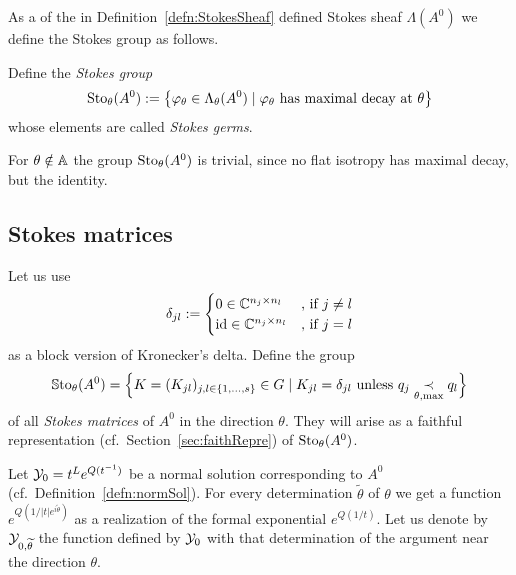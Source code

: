As a  of the in
Definition~\ref{defn:StokesSheaf} defined Stokes sheaf $\Lambda(A^0)$ we
define the Stokes group as follows.
\begin{defn}\label{defn:stokesGroup}
  Define the \emph{Stokes group}
  \[
    \operatorname{Sto}_\theta(A^0):=
    \left\{\varphi_\theta\in\Lambda_\theta(A^0)
      \mid \varphi_\theta \text{ has maximal decay at } \theta
    \right\}
  \]
  whose elements are called \emph{Stokes germs}.
  \begin{s-rem}
    For $\theta\notin\mathbb{A}$ the group $\operatorname{Sto}_\theta(A^0)$ is trivial, since no flat
    isotropy has maximal decay, but the identity.

  \end{s-rem}
\end{defn}

\subsection{Stokes matrices}\label{sec:matrixReps}
\begin{defn}\label{defn:groupOfFaithfullReps}
  Let us use
  \[
    \delta_{jl}:=
    \begin{cases}
      0 \in \mathbb{C}^{n_j\times n_l} & \text{,~if~} j\neq l
    \\\operatorname{id} \in \mathbb{C}^{n_j\times n_l} & \text{,~if~} j=l
    \end{cases}
  \]
  as a block version of Kronecker's delta.
  Define the group
  \begin{align*}
    \operatorname{\mathbb{S}to}_\theta(A^0)= \Big\{K=(K_{jl})_{j,l\in\{1,\dots,s\}}\in G \mid
      K_{jl}=\delta_{jl} \text{~unless~}
      q_j \underset{\theta,\max}{\prec} q_l \Big\}
  \end{align*}
  of all \emph{Stokes matrices} of $A^0$ in the direction $\theta$.
  They will arise as a faithful representation
  (cf.\ Section~\ref{sec:faithRepre}) of $\operatorname{Sto}_\theta(A^0)$.
\end{defn}
Let $\mathcal{Y}_0=t^L e^{Q(t^{-1})}$ be a normal solution corresponding to
$A^0$ (cf.\ Definition~\ref{defn:normSol}).
For every determination $\tilde\theta$ of $\theta$ we
get a function $e^{Q(1/|t|e^{i\tilde\theta})}$ as a realization of the formal
exponential $e^{Q(1/t)}$.
Let us denote by $\mathcal{Y}_{0,\widetilde\theta}$ the function defined by $\mathcal{Y}_0$ with
that determination of the argument near the direction
$\theta$.\label{page:alreadyUsedDefn}

